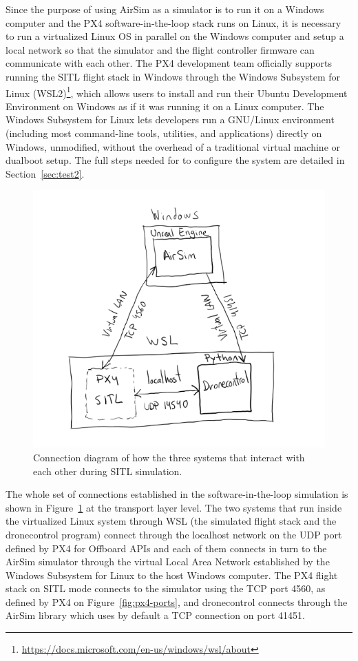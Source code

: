 Since the purpose of using AirSim as a simulator is to run it on a Windows computer and the PX4 software-in-the-loop stack runs on Linux, it is necessary to run a virtualized Linux OS in parallel on the Windows computer and setup a local network so that the simulator and the flight controller firmware can communicate with each other.
The PX4 development team officially supports running the SITL flight stack in Windows through the Windows Subsystem for Linux (WSL2)\footnote{\url{https://docs.microsoft.com/en-us/windows/wsl/about}}, which allows users to install and run their Ubuntu Development Environment on Windows as if it was running it on a Linux computer.
The Windows Subsystem for Linux lets developers run a GNU/Linux environment (including most command-line tools, utilities, and applications) directly on Windows, unmodified, without the overhead of a traditional virtual machine or dualboot setup.
The full steps needed for to configure the system are detailed in Section~\ref{sec:test2}.

\begin{figure}
  \centering
  \includegraphics[scale=0.8,keepaspectratio]{img/sitl-connections.png}
  \caption{Connection diagram of how the three systems that interact with each other during SITL simulation.}\label{fig:sitl-connections}
\end{figure}
The whole set of connections established in the software-in-the-loop simulation is shown in Figure~\ref{fig:sitl-connections} at the transport layer level. The two systems that run inside the virtualized Linux system through WSL (the simulated flight stack and the dronecontrol program) connect through the localhost network on the UDP port defined by PX4 for Offboard APIs and each of them connects in turn to the AirSim simulator through the virtual Local Area Network established by the Windows Subsystem for Linux to the host Windows computer.
The PX4 flight stack on SITL mode connects to the simulator using the TCP port 4560, as defined by PX4 on Figure~\ref{fig:px4-ports}, and dronecontrol connects through the AirSim library which uses by default a TCP connection on port 41451.

